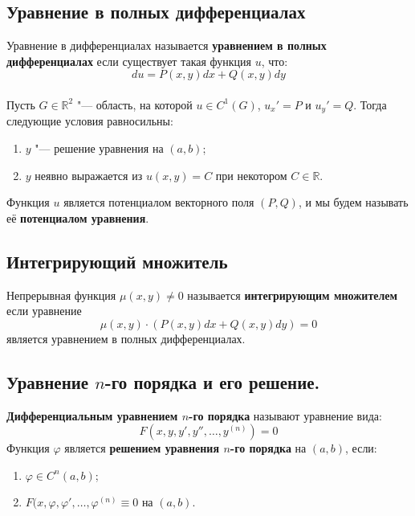 \documentclass{article}
\begin{document}
\subsection{Уравнение в полных дифференциалах}
Уравнение в дифференциалах называется \textbf{уравнением в полных дифференциалах} если существует такая функция $u$, что:
\begin{equation*}
    du = P(x, y)dx + Q(x, y)dy
\end{equation*}
\\
Пусть $G \in \mathbb{R}^2$ "--- область, на которой $u \in C^1(G)$, $u_x' = P$ и $u_y' = Q$. Тогда следующие условия равносильны:
\begin{enumerate}
    \item $y$ "--- решение уравнения на $(a, b)$;
    \item $y$ неявно выражается из $u(x, y) = C$ при некотором $C \in \mathbb{R}$.
\end{enumerate}
Функция $u$ является потенциалом векторного поля $(P, Q)$, и мы будем называть её \textbf{потенциалом уравнения}.

\subsection{Интегрирующий множитель}
Непрерывная функция $\mu(x, y) \neq 0$ называется \textbf{интегрирующим множителем} если уравнение
\begin{equation*}
    \mu(x, y) \cdot (P(x, y)dx + Q(x, y)dy) = 0   
\end{equation*}
является уравнением в полных дифференциалах.

\subsection{Уравнение $n$-го порядка и его решение.}
\textbf{Дифференциальным уравнением $n$-го порядка} называют уравнение вида:
\begin{equation*}
    F(x, y, y', y'', \ldots, y^{(n)}) = 0
\end{equation*}
Функция $\varphi$ является \textbf{решением уравнения $n$-го порядка} на $(a, b)$, если:
\begin{enumerate}
    \item $\varphi \in C^n(a, b)$;
    \item $F(x, \varphi, \varphi', \ldots, \varphi^{(n)} \equiv 0$ на $(a, b)$.
\end{enumerate}
\end{document}
